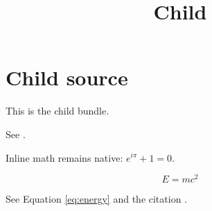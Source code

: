 \documentclass{article}
\title{Child}
\begin{document}
\maketitle

\section{Child source}

This is the child bundle.



See .

Inline math remains native: $e^{i\pi}+1=0$.

\begin{equation}\label{eq:energy}
E = mc^2
\end{equation}

See Equation \eqref{eq:energy} and the citation \cite{doe2026}.



\end{document}
